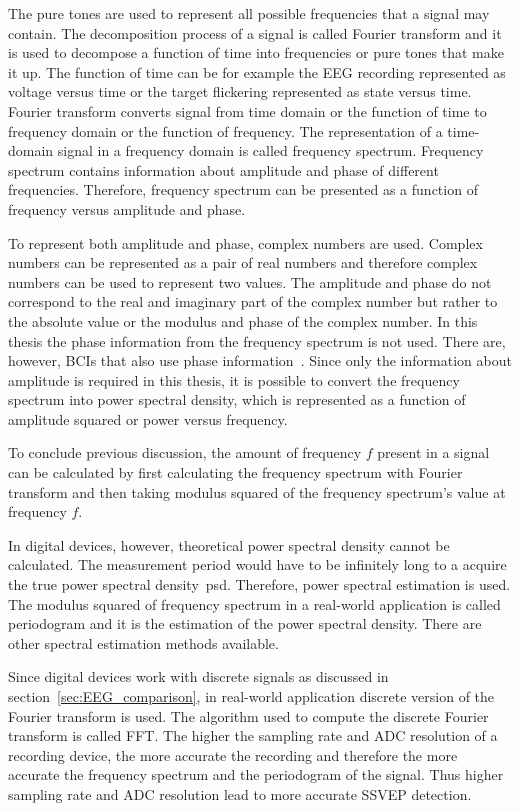 The pure tones are used to represent all possible frequencies that a signal may contain. The decomposition process of a signal is called Fourier transform and it is used to decompose a function of time into frequencies or pure tones that make it up. The function of time can be for example the \gls{EEG} recording represented as voltage versus time or the target flickering represented as state versus time. Fourier transform converts signal from time domain or the function of time to frequency domain or the function of frequency. The representation of a time-domain signal in a frequency domain is called frequency spectrum. Frequency spectrum contains information about amplitude and phase of different frequencies. Therefore, frequency spectrum can be presented as a function of frequency versus amplitude and phase.

To represent both amplitude and phase, complex numbers are used. Complex numbers can be represented as a pair of real numbers and therefore complex numbers can be used to represent two values. The amplitude and phase do not correspond to the real and imaginary part of the complex number but rather to the absolute value or the modulus and phase of the complex number. In this thesis the phase information from the frequency spectrum is not used. There are, however, \glspl{BCI} that also use phase information~\cite{MPCC}. Since only the information about amplitude is required in this thesis, it is possible to convert the frequency spectrum into power spectral density, which is represented as a function of amplitude squared or power versus frequency.

To conclude previous discussion, the amount of frequency $f$ present in a signal can be calculated by first calculating the frequency spectrum with Fourier transform and then taking modulus squared of the frequency spectrum's value at frequency $f$.

In digital devices, however, theoretical power spectral density cannot be calculated. The measurement period would have to be infinitely long to a acquire the true power spectral density~\gls{psd}. Therefore, power spectral estimation is used. The modulus squared of frequency spectrum in a real-world application is called periodogram and it is the estimation of the power spectral density. There are other spectral estimation methods available.

Since digital devices work with discrete signals as discussed in section~\ref{sec:EEG_comparison}, in real-world application discrete version of the Fourier transform is used. The algorithm used to compute the discrete Fourier transform is called \gls{FFT}. The higher the sampling rate and \gls{ADC} resolution of a recording device, the more accurate the recording and therefore the more accurate the frequency spectrum and the periodogram of the signal. Thus higher sampling rate and \gls{ADC} resolution lead to more accurate \gls{SSVEP} detection.

